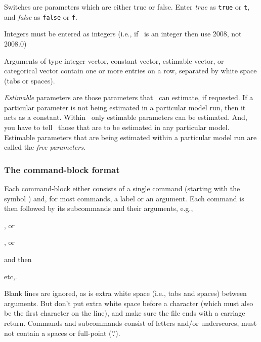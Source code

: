 Switches are parameters which are either true or false. Enter \emph{true} as \texttt{true} or \texttt{t}, and \emph{false} as \texttt{false} or \texttt{f}. 

Integers must be entered as integers (i.e., if \ is an integer then use 2008, not 2008.0)

Arguments of type integer vector, constant vector, estimable vector, or categorical vector contain one or more entries on a row, separated by white space (tabs or spaces). 

\emph{Estimable} parameters are those parameters that \SPM\ can estimate, if requested. If a particular parameter is not being estimated in a particular model run, then it acts as a constant.  Within \SPM\, only estimable parameters can be estimated. And, you have to tell \SPM\ those that are to be estimated in any particular model. Estimable parameters that are being estimated within a particular model run are called the \emph{free parameters}.

\subsubsection{The command-block format}

Each command-block either consists of a single command (starting with the symbol \@) and, for most commands, a label or an argument. Each command is then followed by its subcommands and their arguments, e.g., 

\begin{description}
\item {}, or 
\item {} , or
\item {} 
\end{description}

and then
\begin{description}
\item {} 
\item {} 
\item etc,.
\end{description}

Blank lines are ignored, as is extra white space (i.e., tabs and spaces) between arguments. But don't put extra white space before a \command{} character (which must also be the first character on the line), and make sure the file ends with a carriage return. Commands and subcommands consist of letters and/or underscores, must not contain a spaces or full-point ('.').


